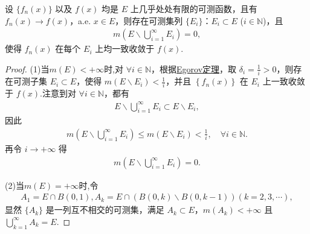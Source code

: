 \documentclass[../../main.tex]{subfiles}%
\begin{document}
\begin{corollary}
设 $\{f_n(x)\}$ 以及 $f(x)$ 均是 $E$ 上几乎处处有限的可测函数，且有 $f_n(x)\to f(x)$，a.e. $x\in E$，则存在可测集列 $\{E_i\}$：$E_i\subset E$ ($i\in\mathbb{N}$)，且
\begin{align*}
m\left(E\backslash\bigcup_{i = 1}^{\infty}E_i\right)=0,
\end{align*}
使得 $f_n(x)$ 在每个 $E_i$ 上均一致收敛于 $f(x)$. 
\end{corollary}
\begin{proof}
(1)当$m(E)<+\infty$时,对 $\forall i\in \mathbb{N}$，根据\hyperref[theorem:Egorov定理]{Egorov定理}，取 $\delta _i=\frac{1}{i}>0$，则存在可测子集 $E_i\subset E$，使得 $m\left( E\backslash E_i \right) <\frac{1}{i}$，并且 $\left\{ f_n\left( x \right) \right\}$ 在 $E_i$ 上一致收敛于 $f\left( x \right)$.注意到对 $\forall i\in \mathbb{N}$，都有
\begin{align*}
E\backslash \bigcup_{i=1}^{\infty}{E_i}\subset E\backslash E_i,
\end{align*}
因此
\begin{align*}
m\left( E\backslash \bigcup_{i=1}^{\infty}{E_i} \right) \leqslant m\left( E\backslash E_i \right) <\frac{1}{i},\quad \forall i\in \mathbb{N}.
\end{align*}
再令 $i\rightarrow +\infty$ 得
\begin{align*}
m\left( E\backslash \bigcup_{i=1}^{\infty}{E_i} \right) =0.
\end{align*}

(2)当$m(E)=+\infty$时,令
\begin{align*}
A_1=E\cap B(0,1),
A_k=E\cap (B(0,k)\backslash B(0,k - 1))(k = 2,3,\cdots),
\end{align*}
显然 $\{A_k\}$ 是一列互不相交的可测集，满足 $A_k\subset E$，$m(A_k)<+\infty$ 且 $\bigcup_{k = 1}^{\infty}A_k=E$.


\end{proof}
\end{document}
